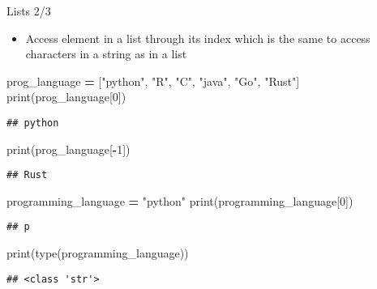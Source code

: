 \documentclass[
  8pt,
  ignorenonframetext,
]{beamer}
\newenvironment{Shaded}{\begin{snugshade}}{\end{snugshade}}
\newcommand{\BuiltInTok}[1]{#1}
\newcommand{\DecValTok}[1]{\textcolor[rgb]{0.00,0.00,0.81}{#1}}
\newcommand{\NormalTok}[1]{#1}
\newcommand{\OperatorTok}[1]{\textcolor[rgb]{0.81,0.36,0.00}{\textbf{#1}}}
\newcommand{\StringTok}[1]{\textcolor[rgb]{0.31,0.60,0.02}{#1}}
\providecommand{\tightlist}{%
  \setlength{\itemsep}{0pt}\setlength{\parskip}{0pt}}
\begin{document}
\begin{frame}[fragile]{Lists 2/3}
\protect\hypertarget{lists-23}{}
\begin{itemize}
\tightlist
\item
  Access element in a list through its index which is the same to access
  characters in a string as in a list
\end{itemize}

\begin{Shaded}
\begin{Highlighting}[]
\NormalTok{prog\_language }\OperatorTok{=}\NormalTok{ [}\StringTok{"python"}\NormalTok{, }\StringTok{"R"}\NormalTok{, }\StringTok{"C"}\NormalTok{, }\StringTok{"java"}\NormalTok{, }\StringTok{"Go"}\NormalTok{, }\StringTok{"Rust"}\NormalTok{]}
\BuiltInTok{print}\NormalTok{(prog\_language[}\DecValTok{0}\NormalTok{])}
\end{Highlighting}
\end{Shaded}

\begin{verbatim}
## python
\end{verbatim}

\begin{Shaded}
\begin{Highlighting}[]
\BuiltInTok{print}\NormalTok{(prog\_language[}\OperatorTok{{-}}\DecValTok{1}\NormalTok{])}
\end{Highlighting}
\end{Shaded}

\begin{verbatim}
## Rust
\end{verbatim}

\begin{Shaded}
\begin{Highlighting}[]
\NormalTok{programming\_language }\OperatorTok{=} \StringTok{"python"}
\BuiltInTok{print}\NormalTok{(programming\_language[}\DecValTok{0}\NormalTok{])}
\end{Highlighting}
\end{Shaded}

\begin{verbatim}
## p
\end{verbatim}

\begin{Shaded}
\begin{Highlighting}[]
\BuiltInTok{print}\NormalTok{(}\BuiltInTok{type}\NormalTok{(programming\_language))}
\end{Highlighting}
\end{Shaded}

\begin{verbatim}
## <class 'str'>
\end{verbatim}
\end{frame}
\end{document}

